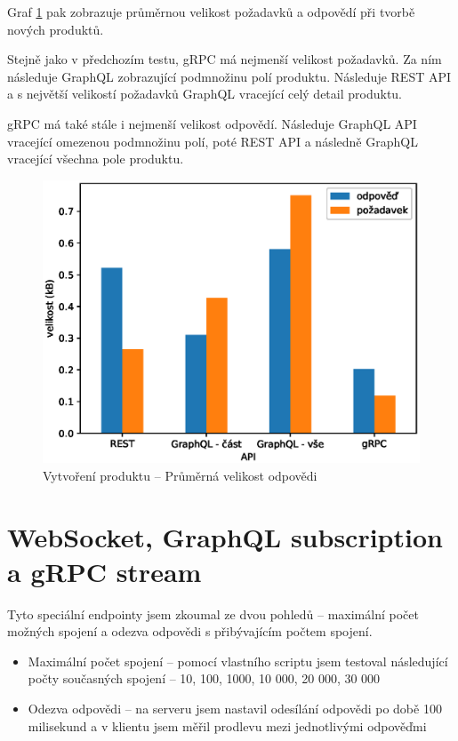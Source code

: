 \documentclass[thesis=M,czech]{FITthesis}[2019/12/23]
\begin{document}
Graf \ref{test_create_product_size} pak zobrazuje průměrnou velikost požadavků a odpovědí při tvorbě nových produktů. 

Stejně jako v předchozím testu, gRPC má nejmenší velikost požadavků. Za ním následuje GraphQL zobrazující podmnožinu polí produktu. Následuje REST API a s největší velikostí požadavků GraphQL vracející celý detail produktu.

gRPC má také stále i nejmenší velikost odpovědí. Následuje GraphQL API vracející omezenou podmnožinu polí, poté REST API a následně GraphQL vracející všechna pole produktu.
\begin{figure}[]
  \includegraphics[width=\linewidth]{img/req-size-create.eps}
  \caption{Vytvoření produktu -- Průměrná velikost odpovědi}
\label{test_create_product_size}
\end{figure}

\clearpage
\section{WebSocket, GraphQL subscription a gRPC stream}
Tyto speciální endpointy jsem zkoumal ze dvou pohledů -- maximální počet možných spojení a odezva odpovědi s přibývajícím počtem spojení.

\begin{itemize}
  \item Maximální počet spojení -- pomocí vlastního scriptu jsem testoval následující počty současných spojení --  10, 100, 1000, 10 000, 20 000, 30 000
  \item Odezva odpovědi -- na serveru jsem nastavil odesílání odpovědi po době 100 milisekund a v klientu jsem měřil prodlevu mezi jednotlivými odpověďmi
\end{itemize}
\end{document}
